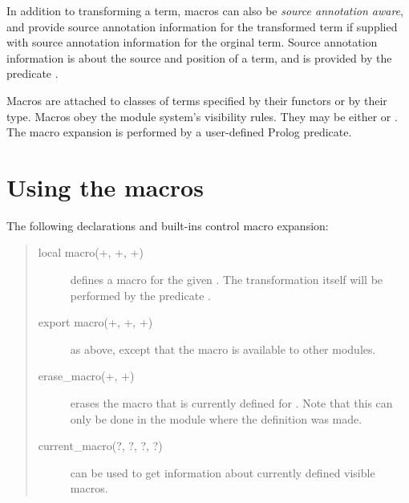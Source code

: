 In addition to transforming a term, macros can also be
\emph{source annotation aware}, and provide source annotation information for
the transformed term if
supplied with source annotation information for the orginal term.  Source
annotation information is about the source and position of a term, and is
provided by the predicate
 .

Macros are attached to classes of terms specified by their functors
or by their type.
Macros obey the module system's visibility rules.
They may be either
or
.
The macro expansion is performed by a user-defined Prolog predicate.


\section{Using the macros}
\label{usingmacros}

The following declarations and built-ins control macro expansion:
\begin{quote}
\begin{description}

\item[local macro(+, +,
  +)]
  defines a macro for the given . The transformation itself
  will
  be performed by the predicate .

\item[export macro(+, +,
      +)]
  as above, except that the macro is available to other modules.

\item[erase_macro(+, +)]
  erases the macro that is  currently defined for . Note that
  this can only be done in the module where the definition was made.

\item[current_macro(?, ?,
       ?, ?)]
  can be used to get information about currently defined visible macros.

\end{description}
\end{quote}


